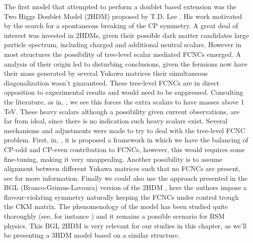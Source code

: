 The first model that attempted to perform a doublet based extension 
was the Two Higgs Doublet Model (2HDM) proposed by T.D. Lee \cite{Lee1973}.  
%
%
His work motivated by the search for a spontaneous breaking of the CP symmetry. 
%
A great deal of interest was invested in 2HDMs, given their possible dark matter candidates large particle spectrum, including charged and additional neutral scalars.
%
However in most structures the possibility of tree-level scalar mediated FCNCs emerged. 
% 
A analysis of their origin led to disturbing conclusions, given the fermions now have their mass generated by several Yukawa matrices their simultaneous diagonalization wasn't guaranteed. 
%
These tree-level FCNCs are in direct opposition to experimental results and would need to be suppressed. 
%
Consulting the literature, as in, \cite{Branco:1999fs}, we see this forces the extra scalars to have masses above 1 TeV.  
%
%
These heavy scalars although a possibility given current observations, are far from ideal, since there is no indication such heavy scalars exist. 
%
Several mechanisms and adjustments were made to try to deal with the tree-level FCNC problem. First, in, \cite{Ferreira_2011,Nebot_2015,ferreira2019strong}, it is proposed a framework in which we have the balancing of CP-odd and CP-even contribution to FCNCs, however, this would requires some fine-tuning, making it very unappealing. 
%
% 
Another possibility is to assume alignment between different Yukawa matrices such that no FCNCs are present, see \cite{Pich_2009,Jung_2010,Jung_2011} for more information. 
%
Finally we could also use the approach presented in the BGL (Branco-Grimus-Lavoura) version of the 2HDM \cite{Branco_1996,LAVOURA1994}, here the authors impose a flavour-violating symmetry naturally keeping the FCNCs under control trough the CKM matrix. 
%
The phenomenology of the model has been studied quite thoroughly (see, for instance \cite{Botella_2014,Botella_2016}) and it remains a possible scenario for BSM physics.
%
This BGL 2HDM is very relevant for our studies in this chapter, as we'll be presenting a 3HDM model based on a similar structure. 

